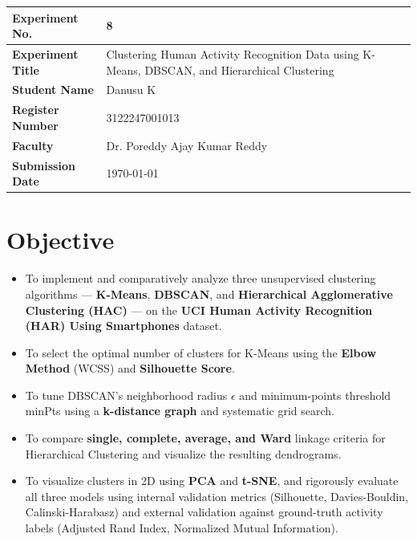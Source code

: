 \documentclass[12pt,a4paper]{article}
\begin{document}
\noindent
\begin{tabular}{|p{3.8cm}|p{11.2cm}|}
\hline
\textbf{Experiment No.} & 8 \\ \hline
\textbf{Experiment Title} & Clustering Human Activity Recognition Data using K-Means, DBSCAN, and Hierarchical Clustering\footnotemark \\ \hline
\textbf{Student Name} & Danusu K \\ \hline
\textbf{Register Number} & 3122247001013 \\ \hline
\textbf{Faculty} & Dr. Poreddy Ajay Kumar Reddy \\ \hline
\textbf{Submission Date} & \today \\ \hline
\end{tabular}

\section{Objective}
\begin{itemize}
\item To implement and comparatively analyze three unsupervised clustering algorithms — \textbf{K-Means}, \textbf{DBSCAN}, and \textbf{Hierarchical Agglomerative Clustering (HAC)} — on the \textbf{UCI Human Activity Recognition (HAR) Using Smartphones} dataset.
\item To select the optimal number of clusters for K-Means using the \textbf{Elbow Method} (WCSS) and \textbf{Silhouette Score}.
\item To tune DBSCAN's neighborhood radius $\epsilon$ and minimum-points threshold minPts using a \textbf{k-distance graph} and systematic grid search.
\item To compare \textbf{single, complete, average, and Ward} linkage criteria for Hierarchical Clustering and visualize the resulting dendrograms.
\item To visualize clusters in 2D using \textbf{PCA} and \textbf{t-SNE}, and rigorously evaluate all three models using internal validation metrics (Silhouette, Davies-Bouldin, Calinski-Harabasz) and external validation against ground-truth activity labels (Adjusted Rand Index, Normalized Mutual Information).
\end{itemize}
\end{document}
